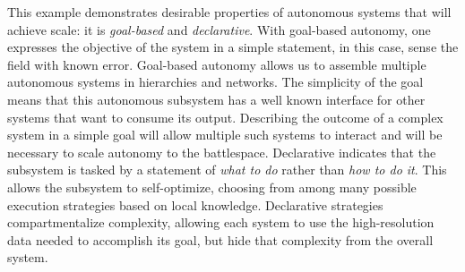This example demonstrates desirable properties of autonomous systems that will achieve scale:  
it is {\em goal-based} and {\em declarative}.  With goal-based autonomy, one expresses the  
objective of the system in a simple statement, in this case, sense the field with known error.  
Goal-based autonomy allows us to assemble multiple autonomous systems in hierarchies and networks.
The simplicity of the goal means that this autonomous subsystem has a well known interface for 
other systems that want to consume its output.  Describing the outcome of a complex system in a 
simple goal will allow multiple such systems to interact and will be necessary to scale 
autonomy to the battlespace.  Declarative indicates that the subsystem is tasked by a statement 
of {\em what to do} rather than {\em how to do it}.  This allows the subsystem to self-optimize,
choosing from among many possible execution strategies based on local knowledge.  Declarative 
strategies compartmentalize complexity, allowing each system to use the high-resolution data
needed to accomplish its goal, but hide that complexity from the overall system.
